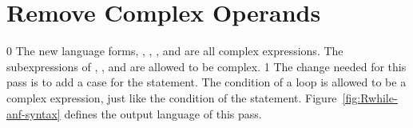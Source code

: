 \documentclass[7x10,nocrop]{TimesAPriori_MIT}%
\def\racketEd{0}
\def\pythonEd{1}
\def\edition{0}
\begin{document}
\section{Remove Complex Operands}
\label{sec:rco-loop}

{\if\edition\racketEd
%
The new language forms, , , , and
 are all complex expressions. The subexpressions of
, , and  are allowed to be complex.
%
\fi}
{\if\edition\pythonEd
%
The change needed for this pass is to add a case for the 
statement. The condition of a  loop is allowed to be a
complex expression, just like the condition of the 
statement.
%
\fi}  
%
Figure~\ref{fig:Rwhile-anf-syntax} defines the output language
\LangLoopANF{} of this pass.


\newcommand{\LwhileMonadASTPython}{
\begin{array}{rcl}
\Stmt{} &::=& \WHILESTMT{\Exp}{\Stmt^{+}} 
\end{array}
}
\end{document}
